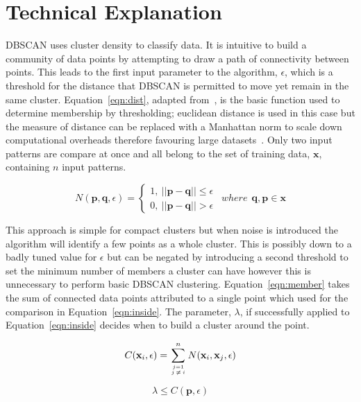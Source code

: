\documentclass{ecsarticle}     %
\begin{document}
\section{Technical Explanation}

DBSCAN uses cluster density to classify data.
It is intuitive to build a community of data points by attempting to draw a path of connectivity between points.
This leads to the first input parameter to the algorithm, $\epsilon$, which is a threshold for the distance that DBSCAN is permitted to move yet remain in the same cluster.
Equation~\eqref{eqn:dist}, adapted from~\cite{ester96dbscan}, is the basic function used to determine membership by thresholding; euclidean distance is used in this case but the measure of distance can be replaced with a Manhattan norm to scale down computational overheads therefore favouring large datasets~\citep{krause86taxicab}.
Only two input patterns are compare at once and all belong to the set of training data, $\textbf{x}$, containing $n$ input patterns.

\begin{equation}
	N(\textbf{p},\textbf{q},\epsilon) = \left\{
		\begin{array}{l}
    		1,\: ||\textbf{p} - \textbf{q}|| \leq \epsilon\\
    		0,\: ||\textbf{p} - \textbf{q}|| > \epsilon
  		\end{array} \right.
	\:\:where\:\: \textbf{q},\textbf{p} \in \textbf{x}
	\label{eqn:dist}
\end{equation}


This approach is simple for compact clusters but when noise is introduced the algorithm will identify a few points as a whole cluster.
This is possibly down to a badly tuned value for $\epsilon$ but can be negated by introducing a second threshold to set the minimum number of members a cluster can have however this is unnecessary to perform basic DBSCAN clustering.
Equation~\eqref{eqn:member} takes the sum of connected data points attributed to a single point which used for the comparison in Equation~\eqref{eqn:inside}. 
The parameter, $\lambda$, if successfully applied to Equation~\eqref{eqn:inside} decides when to build a cluster around the point.

\begin{equation}
	C(\textbf{x}_i,\epsilon) =  \sum\limits_{j=1 \atop j\:\neq\:i}^n N(\textbf{x}_i,\textbf{x}_j,\epsilon)	
	\label{eqn:member}
\end{equation}

\begin{equation}
	\lambda \leq C(\textbf{p},\epsilon) 
	\label{eqn:inside}
\end{equation}
\end{document}
